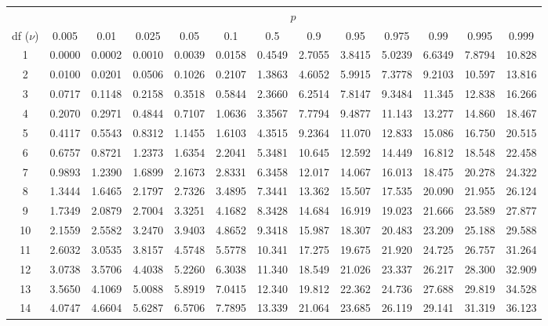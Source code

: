 \begin{table}[htbp]
	\centering
	\setlength{\tabcolsep}{7pt}
	\begin{tabular}{ccccccccccccc}
		& \multicolumn{12}{c}{$p$}\\
		\cline{2-13}
		df ($\nu$) & 0.005 & 0.01 & 0.025 & 0.05 & 0.1 & 0.5 & 0.9 & 0.95 & 0.975 & 0.99 & 0.995 & 0.999 \\
		\hline
		1   & 0.0000 & 0.0002 & 0.0010 & 0.0039 & 0.0158 & 0.4549 & 2.7055 & 3.8415 & 5.0239 & 6.6349 & 7.8794 & 10.828 \\
		2   & 0.0100 & 0.0201 & 0.0506 & 0.1026 & 0.2107 & 1.3863 & 4.6052 & 5.9915 & 7.3778 & 9.2103 & 10.597 & 13.816 \\
		3   & 0.0717 & 0.1148 & 0.2158 & 0.3518 & 0.5844 & 2.3660 & 6.2514 & 7.8147 & 9.3484 & 11.345 & 12.838 & 16.266 \\
		4   & 0.2070 & 0.2971 & 0.4844 & 0.7107 & 1.0636 & 3.3567 & 7.7794 & 9.4877 & 11.143 & 13.277 & 14.860 & 18.467 \\
		5   & 0.4117 & 0.5543 & 0.8312 & 1.1455 & 1.6103 & 4.3515 & 9.2364 & 11.070 & 12.833 & 15.086 & 16.750 & 20.515 \\
		6   & 0.6757 & 0.8721 & 1.2373 & 1.6354 & 2.2041 & 5.3481 & 10.645 & 12.592 & 14.449 & 16.812 & 18.548 & 22.458 \\
		7   & 0.9893 & 1.2390 & 1.6899 & 2.1673 & 2.8331 & 6.3458 & 12.017 & 14.067 & 16.013 & 18.475 & 20.278 & 24.322 \\
		8   & 1.3444 & 1.6465 & 2.1797 & 2.7326 & 3.4895 & 7.3441 & 13.362 & 15.507 & 17.535 & 20.090 & 21.955 & 26.124 \\
		9   & 1.7349 & 2.0879 & 2.7004 & 3.3251 & 4.1682 & 8.3428 & 14.684 & 16.919 & 19.023 & 21.666 & 23.589 & 27.877 \\[5pt]
		10  & 2.1559 & 2.5582 & 3.2470 & 3.9403 & 4.8652 & 9.3418 & 15.987 & 18.307 & 20.483 & 23.209 & 25.188 & 29.588 \\
		11  & 2.6032 & 3.0535 & 3.8157 & 4.5748 & 5.5778 & 10.341 & 17.275 & 19.675 & 21.920 & 24.725 & 26.757 & 31.264 \\
		12  & 3.0738 & 3.5706 & 4.4038 & 5.2260 & 6.3038 & 11.340 & 18.549 & 21.026 & 23.337 & 26.217 & 28.300 & 32.909 \\
		13  & 3.5650 & 4.1069 & 5.0088 & 5.8919 & 7.0415 & 12.340 & 19.812 & 22.362 & 24.736 & 27.688 & 29.819 & 34.528 \\
		14  & 4.0747 & 4.6604 & 5.6287 & 6.5706 & 7.7895 & 13.339 & 21.064 & 23.685 & 26.119 & 29.141 & 31.319 & 36.123 \\

\end{tabular}
\end{table}
